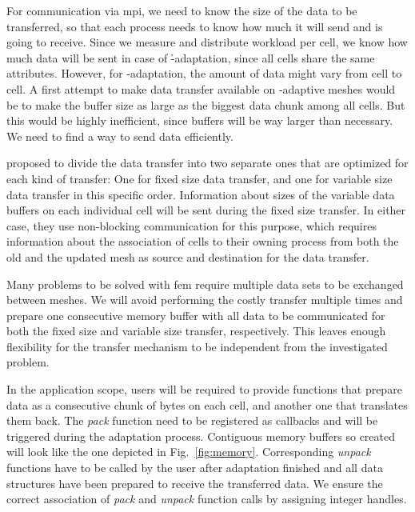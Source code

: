For communication via \gls{mpi}, we need to know the size of the data to be transferred, so that each process needs to know how much it will send and is going to receive. Since we measure and distribute workload per cell, we know how much data will be sent in case of \h-adaptation, since all cells share the same attributes. However, for \p-adaptation, the amount of data might vary from cell to cell.
A first attempt to make data transfer available on \hp-adaptive meshes would be to make the buffer size as large as the biggest data chunk among all cells. But this would be highly inefficient, since buffers will be way larger than necessary. We need to find a way to send data efficiently.

\textcite[Sec.~5.2]{burstedde2018} proposed to divide the data transfer into two separate ones that are optimized for each kind of transfer: One for fixed size data transfer, and one for variable size data transfer in this specific order. Information about sizes of the variable data buffers on each individual cell will be sent during the fixed size transfer. In either case, they use non-blocking communication for this purpose, which requires information about the association of cells to their owning process from both the old and the updated mesh as source and destination for the data transfer.

Many problems to be solved with \gls{fem} require multiple data sets to be exchanged between meshes. We will avoid performing the costly transfer multiple times and prepare one consecutive memory buffer with all data to be communicated for both the fixed size and variable size transfer, respectively. This leaves enough flexibility for the transfer mechanism to be independent from the investigated problem.

In the application scope, users will be required to provide functions that prepare data as a consecutive chunk of bytes on each cell, and another one that translates them back. The \textit{pack} function need to be registered as callbacks and will be triggered during the adaptation process. Contiguous memory buffers so created will look like the one depicted in Fig.~\ref{fig:memory}. Corresponding \textit{unpack} functions have to be called by the user after adaptation finished and all data structures have been prepared to receive the transferred data. We ensure the correct association of \textit{pack} and \textit{unpack} function calls by assigning integer handles.

